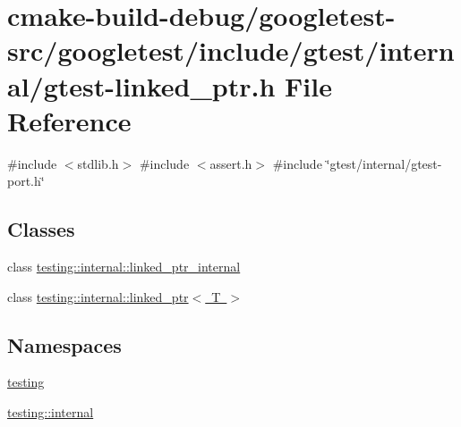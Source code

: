 \hypertarget{gtest-linked__ptr_8h}{}\section{cmake-\/build-\/debug/googletest-\/src/googletest/include/gtest/internal/gtest-\/linked\+\_\+ptr.h File Reference}
\label{gtest-linked__ptr_8h}
{\ttfamily \#include $<$stdlib.\+h$>$}\newline
{\ttfamily \#include $<$assert.\+h$>$}\newline
{\ttfamily \#include \char`\"{}gtest/internal/gtest-\/port.\+h\char`\"{}}\newline
\subsection*{Classes}
\begin{DoxyCompactItemize}
\item 
class \mbox{\hyperlink{classtesting_1_1internal_1_1linked__ptr__internal}{testing\+::internal\+::linked\+\_\+ptr\+\_\+internal}}
\item 
class \mbox{\hyperlink{classtesting_1_1internal_1_1linked__ptr}{testing\+::internal\+::linked\+\_\+ptr$<$ T $>$}}
\end{DoxyCompactItemize}
\subsection*{Namespaces}
\begin{DoxyCompactItemize}
\item 
 \mbox{\hyperlink{namespacetesting}{testing}}
\item 
 \mbox{\hyperlink{namespacetesting_1_1internal}{testing\+::internal}}
\end{DoxyCompactItemize}
